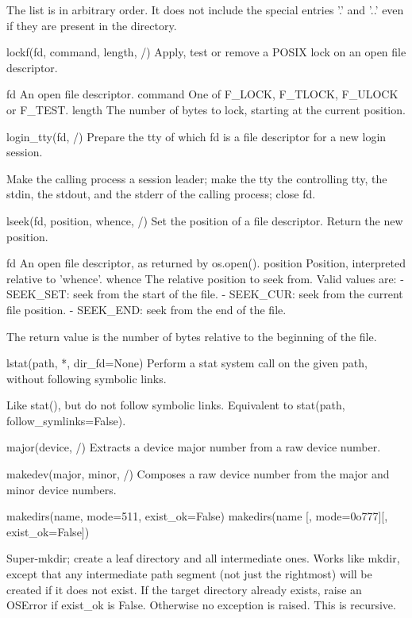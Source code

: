 \documentclass{article}
\begin{document}
        The list is in arbitrary order.  It does not include the special
        entries '.' and '..' even if they are present in the directory.

    lockf(fd, command, length, /)
        Apply, test or remove a POSIX lock on an open file descriptor.

        fd
          An open file descriptor.
        command
          One of F_LOCK, F_TLOCK, F_ULOCK or F_TEST.
        length
          The number of bytes to lock, starting at the current position.

    login_tty(fd, /)
        Prepare the tty of which fd is a file descriptor for a new login session.

        Make the calling process a session leader; make the tty the
        controlling tty, the stdin, the stdout, and the stderr of the
        calling process; close fd.

    lseek(fd, position, whence, /)
        Set the position of a file descriptor.  Return the new position.

          fd
            An open file descriptor, as returned by os.open().
          position
            Position, interpreted relative to 'whence'.
          whence
            The relative position to seek from. Valid values are:
            - SEEK_SET: seek from the start of the file.
            - SEEK_CUR: seek from the current file position.
            - SEEK_END: seek from the end of the file.

        The return value is the number of bytes relative to the beginning of the file.

    lstat(path, *, dir_fd=None)
        Perform a stat system call on the given path, without following symbolic links.

        Like stat(), but do not follow symbolic links.
        Equivalent to stat(path, follow_symlinks=False).

    major(device, /)
        Extracts a device major number from a raw device number.

    makedev(major, minor, /)
        Composes a raw device number from the major and minor device numbers.

    makedirs(name, mode=511, exist_ok=False)
        makedirs(name [, mode=0o777][, exist_ok=False])

        Super-mkdir; create a leaf directory and all intermediate ones.  Works like
        mkdir, except that any intermediate path segment (not just the rightmost)
        will be created if it does not exist. If the target directory already
        exists, raise an OSError if exist_ok is False. Otherwise no exception is
        raised.  This is recursive.
\end{document}
